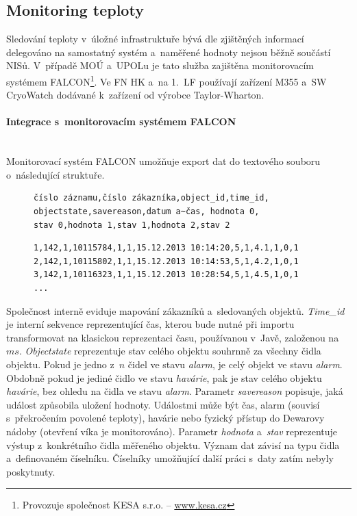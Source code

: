 \documentclass[11pt, final, oneside]{fithesis2}
\newcommand{\paragraphNewLine}[1]{\paragraph*{#1}\mbox{}\\}
\begin{document}
\subsection{Monitoring teploty}
Sledování teploty v~úložné infrastruktuře bývá dle zjištěných informací delegováno na samostatný systém a~naměřené hodnoty nejsou běžně součástí NISů. 
V~případě MOÚ a~UPOLu je tato služba zajištěna monitorovacím systémem FALCON\footnote{Provozuje společnost KESA s.r.o. -- \url{www.kesa.cz}}. Ve FN HK a~na 1.~LF používají zařízení M355 a~SW CryoWatch dodávané k~zařízení od výrobce Taylor-Wharton. 

\paragraphNewLine{Integrace s~monitorovacím systémem FALCON}
Monitorovací systém FALCON umožňuje export dat do textového souboru o~následující struktuře.

\begin{figure}[h!]
\centering
\begin{BVerbatim}
číslo záznamu,číslo zákazníka,object_id,time_id,
objectstate,savereason,datum a~čas, hodnota 0,
stav 0,hodnota 1,stav 1,hodnota 2,stav 2
\end{BVerbatim}
\end{figure}


\begin{figure}[h!]
\centering
\begin{BVerbatim}
1,142,1,10115784,1,1,15.12.2013 10:14:20,5,1,4.1,1,0,1
2,142,1,10115802,1,1,15.12.2013 10:14:53,5,1,4.2,1,0,1
3,142,1,10116323,1,1,15.12.2013 10:28:54,5,1,4.5,1,0,1
...
\end{BVerbatim}
\end{figure}

Společnost interně eviduje mapování zákazníků a~sledovaných objektů. 
\textit{Time\_id} je interní sekvence reprezentující čas, kterou bude nutné při importu transformovat na klasickou reprezentaci času, používanou v~Javě, založenou na $ms$. \textit{Objectstate} reprezentuje stav celého objektu souhrnně za všechny čidla objektu. Pokud je jedno z~$n$ čidel ve stavu \textit{alarm}, je celý objekt ve stavu \textit{alarm}. Obdobně pokud je jediné čidlo ve stavu \textit{havárie}, pak je stav celého objektu \textit{havárie}, bez ohledu na čidla ve stavu \textit{alarm}. Parametr \textit{savereason} popisuje, jaká událost způsobila uložení hodnoty. Událostmi může být čas, alarm (souvisí s~překročením povolené teploty), havárie nebo fyzický přístup do Dewarovy nádoby (otevření víka je monitorováno). Parametr \textit{hodnota} a~\textit{stav} reprezentuje výstup z~konkrétního čidla měřeného objektu. Význam dat závisí na typu čidla a~definovaném číselníku. Číselníky umožňující další práci s~daty zatím nebyly poskytnuty.
\end{document}
